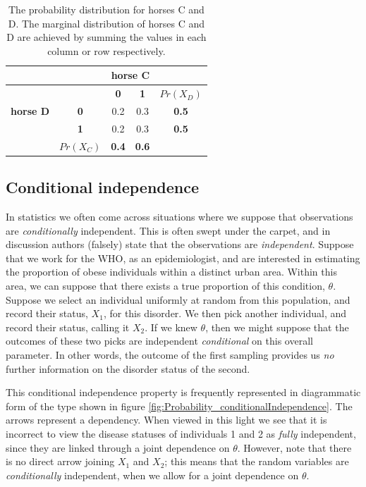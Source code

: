 \documentclass[11pt,fullpage]{book}
\begin{document}
\begin{table}[htbp]
  \centering
    \begin{tabular}{rrccr}
    \toprule
          &       & \multicolumn{2}{c}{\textbf{horse C}} &  \\
    \midrule
          &       & \textbf{0} & \textbf{1} & \multicolumn{1}{c}{\textbf{$Pr(X_D)$}} \\
    \multicolumn{1}{c}{\textbf{horse D}} & \multicolumn{1}{c}{\textbf{0}} & 0.2   & 0.3   & \multicolumn{1}{c}{\textbf{0.5}} \\
    \multicolumn{1}{c}{} & \multicolumn{1}{c}{\textbf{1}} & 0.2   & 0.3   & \multicolumn{1}{c}{\textbf{0.5}} \\
          & \multicolumn{1}{c}{\textbf{$Pr(X_C)$}} & \textbf{0.4} & \textbf{0.6} & \multicolumn{1}{c}{} \\
    \bottomrule
    \end{tabular}%
  \caption{The probability distribution for horses C and D. The marginal distribution of horses C and D are achieved by summing the values in each column or row respectively.}\label{tab:Probability_horsesIndependent}%
\end{table}%

\subsection{Conditional independence}\label{sec:Probability_conditionalIndependence}
In statistics we often come across situations where we suppose that observations are \textit{conditionally} independent. This is often swept under the carpet, and in discussion authors (falsely) state that the observations are \textit{independent}. Suppose that we work for the WHO, as an epidemiologist, and are interested in estimating the proportion of obese individuals within a distinct urban area. Within this area, we can suppose that there exists a true proportion of this condition, $\theta$. Suppose we select an individual uniformly at random from this population, and record their status, $X_1$, for this disorder. We then pick another individual, and record their status, calling it $X_2$. If we knew $\theta$, then we might suppose that the outcomes of these two picks are independent \textit{conditional} on this overall parameter. In other words, the outcome of the first sampling provides us \textit{no} further information on the disorder status of the second.

This conditional independence property is frequently represented in diagrammatic form of the type shown in figure \ref{fig:Probability_conditionalIndependence}. The arrows represent a dependency. When viewed in this light we see that it is incorrect to view the disease statuses of individuals 1 and 2 as \textit{fully} independent, since they are linked through a joint dependence on $\theta$. However, note that there is no direct arrow joining $X_1$ and $X_2$; this means that the random variables are \textit{conditionally} independent, when we allow for a joint dependence on $\theta$. 
\end{document}
